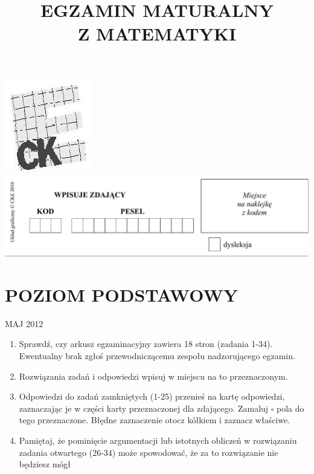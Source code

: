 \documentclass[10pt]{article}
\title{EGZAMIN MATURALNY \\
 Z MATEMATYKI }
\author{}
\date{}
\begin{document}
\maketitle
\includegraphics[max width=\textwidth, center]{2024_11_21_dcf819de2d2eef051a0dg-01(1)}\\
\includegraphics[max width=\textwidth, center]{2024_11_21_dcf819de2d2eef051a0dg-01}

\section*{POZIOM PODSTAWOWY}
MAJ 2012

\begin{enumerate}
  \item Sprawdź, czy arkusz egzaminacyjny zawiera 18 stron (zadania 1-34). Ewentualny brak zgłoś przewodniczącemu zespołu nadzorującego egzamin.
  \item Rozwiązania zadań i odpowiedzi wpisuj w miejscu na to przeznaczonym.
  \item Odpowiedzi do zadań zamkniętych (1-25) przenieś na kartę odpowiedzi, zaznaczając je w części karty przeznaczonej dla zdającego. Zamaluj \(\square\) pola do tego przeznaczone. Błędne zaznaczenie otocz kółkiem i zaznacz właściwe.
  \item Pamiętaj, że pominięcie argumentacji lub istotnych obliczeń w rozwiązaniu zadania otwartego (26-34) może spowodować, że za to rozwiązanie nie będziesz mógł
\end{enumerate}
\end{document}
